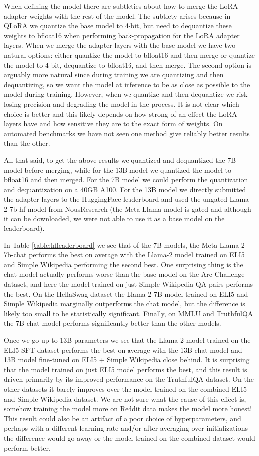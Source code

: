 \documentclass[11pt, oneside]{article}   	%
\begin{document}
When defining the model there are subtleties about how to merge the LoRA adapter weights with the rest of the model.
The subtlety arises because in QLoRA we quantize the base model to 4-bit, but need to dequantize these weights to bfloat16 when performing back-propagation for the LoRA adapter layers.
When we merge the adapter layers with the base model we have two natural options: either quantize the model to bfloat16 and then merge or quantize the model to 4-bit, dequantize to bfloat16, and then merge.
The second option is arguably more natural since during training we are quantizing and then dequantizing, so we want the model at inference to be as close as possible to the model during training.
However, when we quantize and then dequantize we risk losing precision and degrading the model in the process.
It is not clear which choice is better and this likely depends on how strong of an effect the LoRA layers have and how sensitive they are to the exact form of weights. 
On automated benchmarks we have not seen one method give reliably better results than the other.

All that said, to get the above results we quantized and dequantized the 7B model before merging, while for the 13B model we quantized the model to bfloat16 and then merged. 
For the 7B model we could perform the quantization and dequantization on a 40GB A100.
For the 13B model we directly submitted the adapter layers to the HuggingFace leaderboard and used the ungated Llama-2-7b-hf model from NousResearch (the Meta-Llama model is gated and although it can be downloaded, we were not able to use it as a base model on the leaderboard).

In Table \ref{table:hfleaderboard} we see that of the 7B models, the Meta-Llama-2-7b-chat performs the best on average with the Llama-2 model trained on ELI5 and Simple Wikipedia performing the second best.
One surprising thing is the chat model actually performs worse than the base model on the Arc-Challenge dataset, and here the model trained on just Simple Wikipedia QA pairs performs the best. 
On the HellaSwag dataset the Llama-2-7B model trained on ELI5 and Simple Wikipedia marginally outperforms the chat model, but the difference is likely too small to be statistically significant.
Finally, on MMLU and TruthfulQA the 7B chat model performs significantly better than the other models.

Once we go up to 13B parameters we see that the Llama-2 model trained on the ELI5 SFT dataset performs the best on average with the 13B chat model and 13B model fine-tuned on ELI5 + Simple Wikipedia close behind.
It is surprising that the model trained on just ELI5 model performs the best, and this result is driven primarily by its improved performance on the TruthfulQA dataset. 
On the other datasets it barely improves over the model trained on the combined ELI5 and Simple Wikipedia dataset.
We are not sure what the cause of this effect is, somehow training the model more on Reddit data makes the model more honest!
This result could also be an artifact of a poor choice of hyperparameters, and perhaps with a different learning rate and/or after averaging over initializations the difference would go away or the model trained on the combined dataset would perform better.
\end{document}
